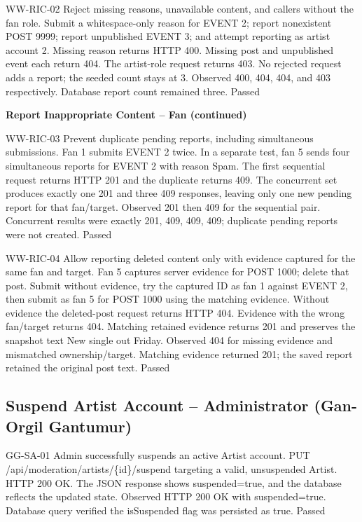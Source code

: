 \documentclass[11pt]{report}
\begin{document}
\williamtestcase
{WW-RIC-02}
{Reject missing reasons, unavailable content, and callers without the fan role.}
{Submit a whitespace-only reason for EVENT 2; report nonexistent POST 9999; report unpublished EVENT 3; and attempt reporting as artist account 2.}
{Missing reason returns HTTP 400. Missing post and unpublished event each return 404. The artist-role request returns 403. No rejected request adds a report; the seeded count stays at 3.}
{Observed 400, 404, 404, and 403 respectively. Database report count remained three.}
{Passed}

\clearpage
\noindent\textbf{Report Inappropriate Content -- Fan (continued)}\par
\williamtestcase
{WW-RIC-03}
{Prevent duplicate pending reports, including simultaneous submissions.}
{Fan 1 submits EVENT 2 twice. In a separate test, fan 5 sends four simultaneous reports for EVENT 2 with reason Spam.}
{The first sequential request returns HTTP 201 and the duplicate returns 409. The concurrent set produces exactly one 201 and three 409 responses, leaving only one new pending report for that fan/target.}
{Observed 201 then 409 for the sequential pair. Concurrent results were exactly 201, 409, 409, 409; duplicate pending reports were not created.}
{Passed}

\williamtestcase
{WW-RIC-04}
{Allow reporting deleted content only with evidence captured for the same fan and target.}
{Fan 5 captures server evidence for POST 1000; delete that post. Submit without evidence, try the captured ID as fan 1 against EVENT 2, then submit as fan 5 for POST 1000 using the matching evidence.}
{Without evidence the deleted-post request returns HTTP 404. Evidence with the wrong fan/target returns 404. Matching retained evidence returns 201 and preserves the snapshot text New single out Friday.}
{Observed 404 for missing evidence and mismatched ownership/target. Matching evidence returned 201; the saved report retained the original post text.}
{Passed}

\clearpage
\subsection*{Suspend Artist Account -- Administrator (Gan-Orgil Gantumur)}
\gantestcase
{GG-SA-01}
{Admin successfully suspends an active Artist account.}
{PUT /api/moderation/artists/\{id\}/suspend targeting a valid, unsuspended Artist.}
{HTTP 200 OK. The JSON response shows suspended=true, and the database reflects the updated state.}
{Observed HTTP 200 OK with suspended=true. Database query verified the isSuspended flag was persisted as true.}
{Passed}
\end{document}
